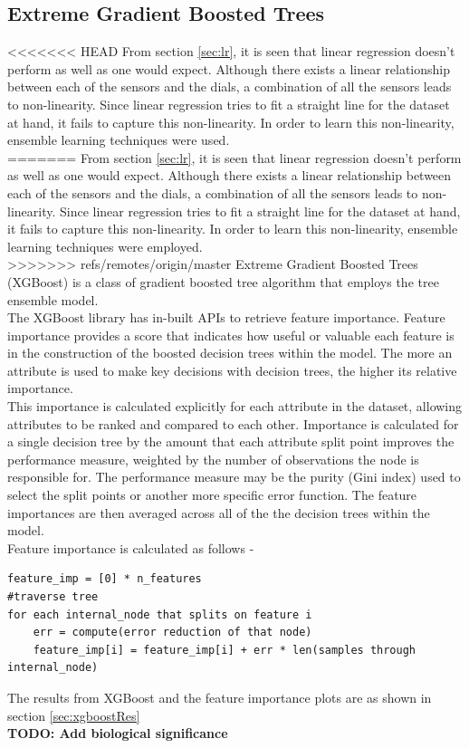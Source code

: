 \documentclass[12pt,chapterheads]{ucsd}
\begin{document}
\subsection{Extreme Gradient Boosted Trees}\label{sec:xgboost}
<<<<<<< HEAD
From section \ref{sec:lr}, it is seen that linear regression doesn't perform as well as one would expect. Although there exists a linear relationship between each of the sensors and the dials, a combination of all the sensors leads to non-linearity. Since linear regression tries to fit a straight line for the dataset at hand, it fails to capture this non-linearity. In order to learn this non-linearity, ensemble learning techniques were used.\\
=======
From section \ref{sec:lr}, it is seen that linear regression doesn't perform as well as one would expect. Although there exists a linear relationship between each of the sensors and the dials, a combination of all the sensors leads to non-linearity. Since linear regression tries to fit a straight line for the dataset at hand, it fails to capture this non-linearity. In order to learn this non-linearity, ensemble learning techniques were employed.\\
>>>>>>> refs/remotes/origin/master
Extreme Gradient Boosted Trees \string(XGBoost) \cite{Chen:2016:XST:2939672.2939785} is a class of gradient boosted tree algorithm that employs the tree ensemble model.\\
The XGBoost library has in-built APIs to retrieve feature importance. Feature importance provides a score that indicates how useful or valuable each feature is in the construction of the boosted decision trees within the model. The more an attribute is used to make key decisions with decision trees, the higher its relative importance.\\
This importance is calculated explicitly for each attribute in the dataset, allowing attributes to be ranked and compared to each other. Importance is calculated for a single decision tree by the amount that each attribute split point improves the performance measure, weighted by the number of observations the node is responsible for. The performance measure may be the purity (Gini index) used to select the split points or another more specific error function. The feature importances are then averaged across all of the the decision trees within the model.\\
Feature importance is calculated as follows -
\begin{verbatim}
feature_imp = [0] * n_features
#traverse tree
for each internal_node that splits on feature i
    err = compute(error reduction of that node)
    feature_imp[i] = feature_imp[i] + err * len(samples through internal_node)
\end{verbatim}
The results from XGBoost and the feature importance plots are as shown in section \ref{sec:xgboostRes}\\
\textbf{TODO: Add biological significance}
\end{document}
